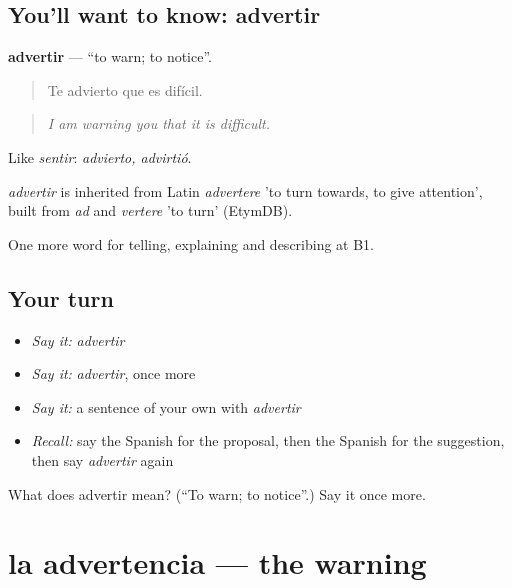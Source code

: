\subsection*{You'll want to know: advertir}
\textbf{advertir} — \textquotedblleft{}to warn; to notice\textquotedblright{}.

\begin{quote}
Te advierto que es difícil.
\end{quote}

\begin{quote}
\emph{I am warning you that it is difficult.}
\end{quote}

Like \emph{sentir}: \emph{advierto, advirtió}.

\begin{cousinweb}
\emph{advertir} is inherited from Latin \emph{advertere} 'to turn towards, to give attention', built from \emph{ad} and \emph{vertere} 'to turn' (EtymDB).
\end{cousinweb}

\begin{grammarlens}[title={What you've built}]
One more word for telling, explaining and describing at B1.
\end{grammarlens}

\subsection*{Your turn}
\begin{itemize}
\raggedright
  \item \emph{Say it:} \emph{advertir}
  \item \emph{Say it:} \emph{advertir}, once more
  \item \emph{Say it:} a sentence of your own with \emph{advertir}
  \item \emph{Recall:} say the Spanish for the proposal, then the Spanish for the suggestion, then say \emph{advertir} again
\end{itemize}

\begin{tcolorbox}[breakable,colback=teal!4,colframe=teal!35!black,title={Before you move on}]
What does advertir mean? (\textquotedblleft{}To warn; to notice\textquotedblright{}.) Say it once more.
\end{tcolorbox}
\section[la advertencia]{la advertencia — the warning}

